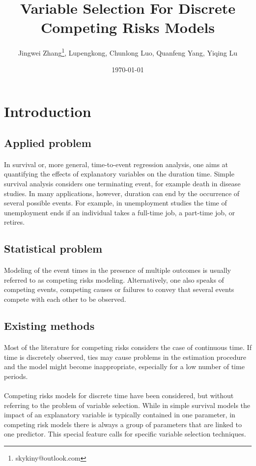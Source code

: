 \documentclass[]{article}
\title{Variable Selection For Discrete Competing Risks Models}
\date{\today}
\author{%
   Jingwei Zhang\thanks{skykiny@outlook.com},
   Lupengkong, 
   Chunlong Luo,
   Quanfeng Yang,
   Yiqing Lu
}
\begin{document}
    \maketitle
    
    \section{Introduction}
    \subsection{Applied problem}
        \paragraph{}In survival or, more general, time-to-event regression analysis, one aims at quantifying the effects of explanatory variables on the duration time. Simple survival analysis considers one terminating event, for example death in disease studies. In many applications, however, duration can end by the occurrence of several possible events. For example, in unemployment studies the time of unemployment ends if an individual takes a full-time job, a part-time job, or retires.
    \subsection{Statistical problem}
        \paragraph{}Modeling of the event times in the presence of multiple outcomes is usually referred to as competing risks modeling. Alternatively, one also speaks of competing events, competing causes or failures to convey that several events compete with each other to be observed.
    \subsection{Existing methods}
        \paragraph{}Most of the literature for competing risks considers the case of continuous time. If time is discretely observed, ties may cause problems in the estimation procedure and the model might become inappropriate, especially for a low number of time periods.
        \paragraph{}Competing risks models for discrete time have been considered, but without referring to the problem of variable selection. While in simple survival models the impact of an explanatory variable is typically contained in one parameter, in competing risk models there is always a group of parameters that are linked to one predictor. This special feature calls for specific variable selection techniques.
\end{document}
